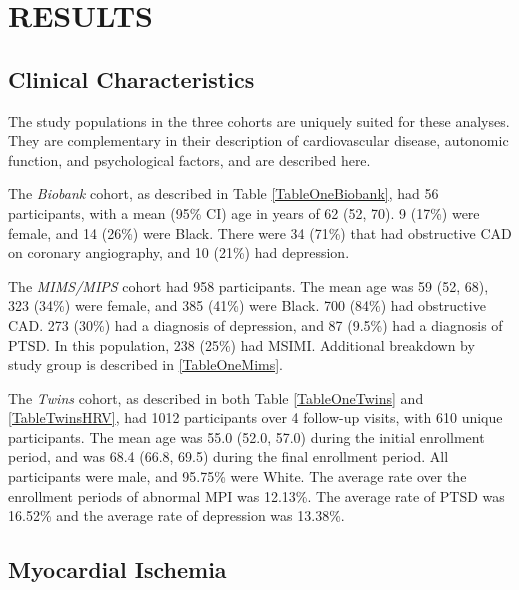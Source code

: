 \documentclass[
  11pt,
  openany]{book}
\begin{document}
\hypertarget{part-results}{%
\part*{RESULTS}\label{part-results}}

\hypertarget{clinical-characteristics-1}{%
\chapter{Clinical Characteristics}\label{clinical-characteristics-1}}

The study populations in the three cohorts are uniquely suited for these analyses. They are complementary in their description of cardiovascular disease, autonomic function, and psychological factors, and are described here.

The \emph{Biobank} cohort, as described in Table \ref{TableOneBiobank}, had 56 participants, with a mean (95\% CI) age in years of 62 (52, 70).
9 (17\%) were female, and 14 (26\%) were Black.
There were 34 (71\%) that had obstructive CAD on coronary angiography, and 10 (21\%) had depression.

The \emph{MIMS/MIPS} cohort had 958 participants.
The mean age was 59 (52, 68), 323 (34\%) were female, and 385 (41\%) were Black.
700 (84\%) had obstructive CAD.
273 (30\%) had a diagnosis of depression, and 87 (9.5\%) had a diagnosis of PTSD.
In this population, 238 (25\%) had MSIMI.
Additional breakdown by study group is described in \ref{TableOneMims}.

The \emph{Twins} cohort, as described in both Table \ref{TableOneTwins} and \ref{TableTwinsHRV}, had 1012 participants over 4 follow-up visits, with 610 unique participants.
The mean age was 55.0 (52.0, 57.0) during the initial enrollment period, and was 68.4 (66.8, 69.5) during the final enrollment period.
All participants were male, and 95.75\% were White.
The average rate over the enrollment periods of abnormal MPI was 12.13\%.
The average rate of PTSD was 16.52\% and the average rate of depression was 13.38\%.

\hypertarget{myocardial-ischemia-1}{%
\chapter{Myocardial Ischemia}\label{myocardial-ischemia-1}}
\end{document}
